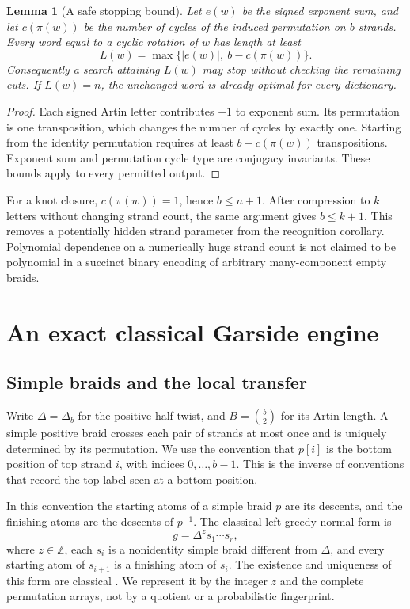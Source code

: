 \documentclass[11pt,a4paper]{article}
\newtheorem{lemma}[theorem]{Lemma}
\theoremstyle{definition}\newtheorem{definition}[theorem]{Definition}
\theoremstyle{remark}\newtheorem{remark}[theorem]{Remark}
\newcommand{\Z}{\mathbb Z}
\begin{document}
\begin{lemma}[A safe stopping bound]\label{lem:lower}
Let $e(w)$ be the signed exponent sum, and let $c(\pi(w))$ be the number of
cycles of the induced permutation on $b$ strands. Every word equal to a cyclic
rotation of $w$ has length at least
\[
 L(w)=\max\bigl\{|e(w)|,\ b-c(\pi(w))\bigr\}.
\]
Consequently a search attaining $L(w)$ may stop without checking the remaining
cuts. If $L(w)=n$, the unchanged word is already optimal for every dictionary.
\end{lemma}
\begin{proof}
Each signed Artin letter contributes $\pm1$ to exponent sum. Its permutation
is one transposition, which changes the number of cycles by exactly one.
Starting from the identity permutation requires at least $b-c(\pi(w))$
transpositions. Exponent sum and permutation cycle type are conjugacy
invariants. These bounds apply to every permitted output.
\end{proof}

For a knot closure, $c(\pi(w))=1$, hence $b\le n+1$. After compression to $k$
letters without changing strand count, the same argument gives $b\le k+1$.
This removes a potentially hidden strand parameter from the recognition
corollary. Polynomial dependence on a numerically huge strand count is not
claimed to be polynomial in a succinct binary encoding of arbitrary
many-component empty braids.

\section{An exact classical Garside engine}

\subsection{Simple braids and the local transfer}
Write $\Delta=\Delta_b$ for the positive half-twist, and
$B=\binom b2$ for its Artin length. A simple positive braid crosses each pair
of strands at most once and is uniquely determined by its permutation.
We use the convention that $p[i]$ is the bottom position of top strand $i$,
with indices $0,\ldots,b-1$. This is the inverse of conventions that record
the top label seen at a bottom position.

In this convention the starting atoms of a simple braid $p$ are its descents,
and the finishing atoms are the descents of $p^{-1}$. The classical
left-greedy normal form is
\begin{equation}\label{eq:nf}
 g=\Delta^z s_1\cdots s_r,
\end{equation}
where $z\in\Z$, each $s_i$ is a nonidentity simple braid different from
$\Delta$, and every starting atom of $s_{i+1}$ is a finishing atom of $s_i$.
The existence and uniqueness of this form are classical
\cite{Dehornoy2007}. We represent it by the integer $z$ and the complete
permutation arrays, not by a quotient or a probabilistic fingerprint.
\end{document}
